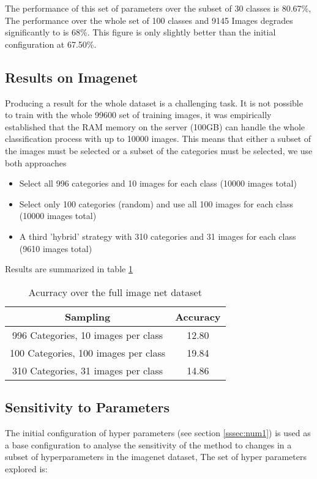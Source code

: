 \documentclass[10pt,twocolumn,letterpaper]{article}
\begin{document}
The performance of this set of parameters over  the subset of 30 classes is 80.67\%, The performance over the whole set of 100 classes and 9145 Images degrades significantly to is 68\%. This figure is only slightly better than the initial configuration at 67.50\%.

\subsection{Results on Imagenet}

Producing a result for the whole dataset is a challenging task. It is not possible to train with the whole 99600 set of training images, it was empirically established that the RAM memory on the server (100GB) can handle the whole classification process with up to 10000 images.  This means that either a subset of the images must be selected or a subset of the categories must be selected, we use both approaches

\begin{itemize}
\item Select all 996 categories and 10 images for each class (10000 images total)
\item Select only 100 categories (random) and use all 100 images for each class (10000 images total)
\item A third 'hybrid' strategy  with 310 categories and 31 images for each class (9610 images total)
\end{itemize}

Results are summarized in table \ref{table:tableFA}
\begin{table}[t]
\centering
\begin{tabular}{c | c }
Sampling & Accuracy    \\
\hline	
996 Categories, 10 images per class & 12.80  \\
100 Categories, 100 images per class & 19.84 \\
310 Categories, 31 images per class & 14.86 \\

\end{tabular}
\caption{Acurracy over the full image net dataset}
\label{table:tableFA}
\end{table}


\subsection{Sensitivity to Parameters}
The initial configuration of hyper parameters (see section \ref{sssec:num1}) is used as a base configuration to analyse the sensitivity of the method to changes in a subset of hyperparameters in the imagenet dataset, The set of hyper parameters explored is:
\end{document}
